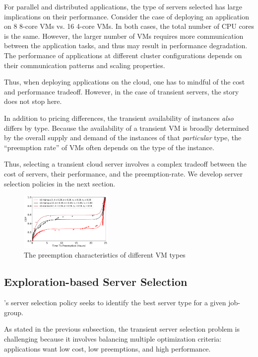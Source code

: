For parallel and distributed applications, the type of servers selected has large implications on their performance.
Consider the case of deploying an application on 8 8-core VMs vs. 16 4-core VMs.
In both cases, the total number of CPU cores is the same.
However, the larger number of VMs requires more communication between the application tasks, and thus may result in performance degradation.
The performance of applications at different cluster configurations depends on their communication patterns and scaling properties. 



Thus, when deploying applications on the cloud, one has to mindful of the cost and performance tradeoff.
However, in the case of transient servers, the story does not stop here. 


In addition to pricing differences, the transient availability of instances \emph{also} differs by type.
Because the availability of a transient VM is broadly determined by the overall supply and demand of the instances of that \emph{particular} type, the ``preemption rate'' of VMs often depends on the type of the instance.



Thus, selecting a transient cloud server involves a complex tradeoff between the cost of servers, their performance, and the preemption-rate.
We develop server selection policies in the next section.


\begin{figure}
  \centering 
  \includegraphics[width=0.4\textwidth]{../graphs/cdf_comparison_3.pdf}
  \caption{The preemption characteristics of different VM types}
  \label{fig:cdf-comparison}
\end{figure}


\subsection{Exploration-based Server Selection}

\sysname's server selection policy seeks to identify the best server type for a given job-group.

As stated in the previous subsection, the transient server selection problem is challenging because it involves balancing multiple optimization criteria: applications want low cost, low preemptions, and high performance.

